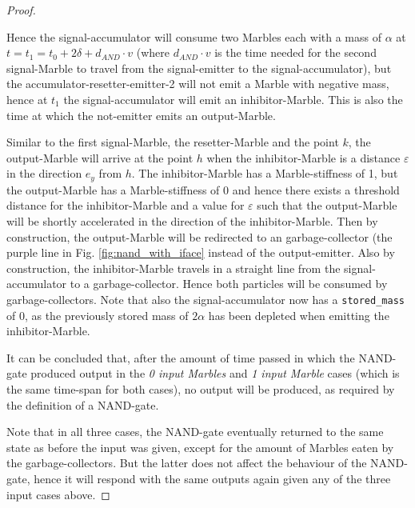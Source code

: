 \begin{proof}
\begin{enumerate}
        Hence the signal-accumulator will consume two Marbles each with a mass of $\alpha$ at $t = t_1 = t_0 + 2\delta +  d_{AND}\cdot v$ (where $d_{AND}\cdot v$ is the time needed for the second signal-Marble to travel from the signal-emitter to the signal-accumulator), but the accumulator-resetter-emitter-2 will not emit a Marble with negative mass, hence at $t_1$ the signal-accumulator will emit an inhibitor-Marble. This is also the time at which the not-emitter emits an output-Marble. 
        
        Similar to the first signal-Marble, the resetter-Marble and the point $k$, the output-Marble will arrive at the point $h$ when the inhibitor-Marble is a distance $\varepsilon$ in the direction $e_y$ from $h$. The inhibitor-Marble has a Marble-stiffness of 1, but the output-Marble has a Marble-stiffness of 0 and hence there exists a threshold distance for the inhibitor-Marble and a value for $\varepsilon$ such that the output-Marble will be shortly accelerated in the direction of the inhibitor-Marble. Then by construction, the output-Marble will be redirected to an garbage-collector (the purple line in Fig. \ref{fig:nand_with_iface} instead of the output-emitter. Also by construction, the inhibitor-Marble travels in a straight line from the signal-accumulator to a garbage-collector. Hence both particles will be consumed by garbage-collectors. Note that also the signal-accumulator now has a \texttt{stored\_mass} of 0, as the previously stored mass of $2\alpha$ has been depleted when emitting the inhibitor-Marble. 
        
        It can be concluded that, after the amount of time passed in which the NAND-gate produced output in the \textit{0 input Marbles} and \textit{1 input Marble} cases (which is the same time-span for both cases), no output will be produced, as required by the definition of a NAND-gate.
    \end{enumerate}
    Note that in all three cases, the NAND-gate eventually returned to the same state as before the input was given, except for the amount of Marbles eaten by the garbage-collectors. But the latter does not affect the behaviour of the NAND-gate, hence it will respond with the same outputs again given any of the three input cases above.
\end{proof}
\clearpage
